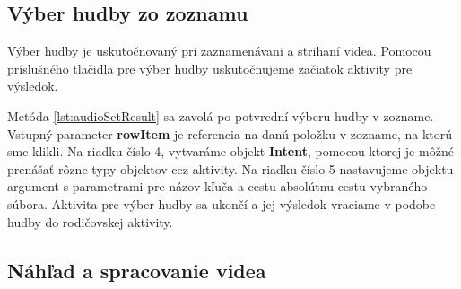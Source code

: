 \documentclass[12pt, oneside]{book}
\begin{document}
\subsection{Výber hudby zo zoznamu}

\hspace{15pt} Výber hudby je uskutočnovaný pri zaznamenávani a strihaní videa. Pomocou príslušného tlačidla pre výber hudby uskutočnujeme začiatok aktivity pre výsledok. 






Metóda \autoref{lst:audioSetResult} sa zavolá po potvrední výberu hudby v zozname. Vstupný parameter \textbf{rowItem} je referencia na danú položku v zozname, na ktorú sme klikli. Na riadku číslo 4, vytvaráme objekt \textbf{Intent}, pomocou ktorej je môžné prenášať rôzne typy objektov cez aktivity. Na riadku číslo 5 nastavujeme objektu argument s parametrami pre názov kľuča a cestu absolútnu cestu vybraného súbora. Aktivita pre výber hudby sa ukončí a jej výsledok vraciame v podobe hudby do rodičovskej aktivity.



\subsection{Náhľad a spracovanie videa}


\end{document}
